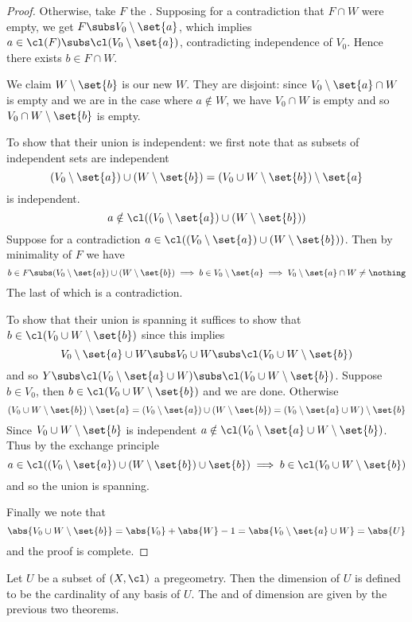 \begin{proof}
    Otherwise, take $F$ the 
    .
    Supposing for a contradiction that $F \cap W$ were empty,
    we get $F \subs V_0 \setminus \set{a}$, which implies 
    $a \in \cl(F) \subs \cl(V_0 \setminus \set{a})$, 
    contradicting independence of $V_0$.
    Hence there exists $b \in F \cap W$.

    We claim $W \setminus \set{b}$ is our new $W$.
    They are disjoint: since $V_0 \setminus \set{a} \cap W$ is empty 
    and we are in the case where $a \notin W$, we have $V_0 \cap W$ is empty
    and so $V_0 \cap W \setminus \set{b}$ is empty.

    To show that their union is independent:
    we first note that as subsets of independent sets are independent
    \[(V_0 \setminus \set{a}) \cup (W \setminus \set{b})
    = (V_0 \cup W \setminus \set{b}) \setminus \set{a}\]
    is independent.
    \[a \notin \cl((V_0 \setminus \set{a}) \cup (W \setminus \set{b}))\]
    Suppose for a contradiction 
    $a \in \cl((V_0 \setminus \set{a}) \cup (W \setminus \set{b}))$.
    Then by minimality of $F$ we have 
    \[
        b \in F \subs (V_0 \setminus \set{a}) \cup (W \setminus \set{b})
        \implies 
        b \in V_0 \setminus \set{a}
        \implies
        V_0 \setminus \set{a} \cap W \ne \nothing
    \]
    The last of which is a contradiction.

    To show that their union is spanning it suffices to show that 
    $b \in \cl(V_0 \cup W \setminus \set{b})$ since this implies 
    \[V_0 \setminus \set{a} \cup W \subs V_0 \cup W 
    \subs \cl(V_0 \cup W \setminus \set{b})\]
    and so $Y \subs \cl(V_0 \setminus \set{a} \cup W)
    \subs \cl(V_0 \cup W \setminus \set{b})$.
    Suppose $b \in V_0$, 
    then $b \in \cl(V_0 \cup W \setminus \set{b})$ and we are done.
    Otherwise 
    \[
        (V_0 \cup W  \setminus \set{b}) \setminus \set{a} =
        (V_0 \setminus \set{a}) \cup (W \setminus \set{b}) = 
        (V_0 \setminus \set{a} \cup W) \setminus \set{b}
    \]
    Since $V_0 \cup W \setminus \set{b}$ is independent
    $a \notin \cl(V_0 \setminus \set{a} \cup W \setminus \set{b})$. 
    Thus by the exchange principle
    \[a \in \cl((V_0 \setminus \set{a}) \cup (W \setminus \set{b}) \cup \set{b}) 
    \implies 
    b \in \cl(V_0 \cup W \setminus \set{b})\]
    and so the union is spanning.

    Finally we note that 
    \[\abs{V_0 \cup W \setminus \set{b}} = \abs{V_0} + \abs{W} - 1 = 
    \abs{V_0 \setminus \set{a} \cup W} = \abs{U}\]
    and the proof is complete.
\end{proof}

\begin{dfn}[Dimension]
    Let $U$ be a subset of $(X,\cl)$ a pregeometry.
    Then the dimension of $U$ is defined to be the cardinality of any basis of 
    $U$.
    The  and 
    of dimension are given by the previous two theorems.
\end{dfn}
